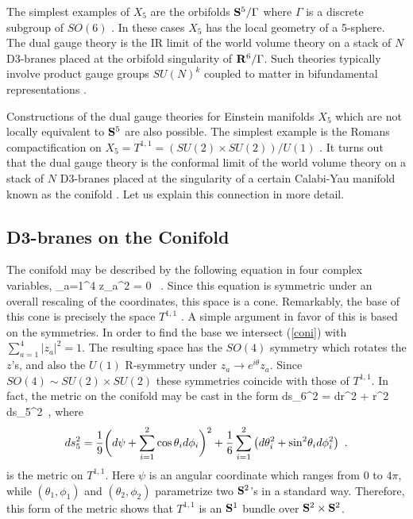 The simplest examples of $X_5$ are the orbifolds ${\bf S}^5/\Gamma$ where 
$\Gamma$ is a discrete subgroup of $SO(6)$ \cite{ks,lnv}. In these cases
$X_5$ has the local geometry of a 5-sphere.
The dual gauge theory is the IR
limit of the world volume theory on a stack of $N$ D3-branes placed at
the orbifold singularity of ${\bf R}^6/\Gamma$. Such theories
typically involve product gauge groups $SU(N)^k$ coupled to matter
in bifundamental representations \cite{dm}.

Constructions of the dual gauge theories for Einstein manifolds
$X_5$ which are not locally equivalent to ${\bf S}^5$ are also possible. 
The simplest
example is the Romans compactification on
$X_5= T^{1,1}= (SU(2)\times SU(2))/U(1)$ \cite{Romans,KW}. 
It turns out that
the dual gauge theory is the conformal limit of 
the world volume theory on a stack of $N$ D3-branes placed at
the singularity of a certain Calabi-Yau
manifold known as the conifold \cite{KW}. Let us explain this connection
in more detail. 

\subsection{D3-branes on the Conifold}

The conifold may be described by the
following equation in four complex variables,
\be \label{coni}
\sum_{a=1}^4 z_a^2 = 0
\ .
\ee
Since this equation is symmetric under an overall rescaling of the
coordinates, this space is a cone. Remarkably, the base of this cone
is precisely the space $T^{1,1}$ \cite{cd,KW}. A simple argument
in favor of this is based on the symmetries. In order to find the base
we intersect (\ref{coni}) with $\sum_{a=1}^4 |z_a|^2 = 1$.
The resulting space has the $SO(4)$ symmetry which rotates the $z$'s,
and also the $U(1)$ R-symmetry under $z_a\rightarrow e^{i\theta} z_a$.
Since $SO(4)\sim SU(2)\times SU(2)$ these symmetries coincide with those
of $T^{1,1}$. In fact, the metric on the conifold may be
cast in the form \cite{cd}
\be
ds_6^2 = dr^2 + r^2 ds_5^2\ ,
\ee
where 
\begin{equation} \label{co}
d s_5^2=
{1\over 9} \bigg(d\psi + 
\sum_{i=1}^2 \cos \theta_i d\phi_i\bigg)^2+
{1\over 6} \sum_{i=1}^2 \left(
d\theta_i^2 + {\rm sin}^2\theta_i d\phi_i^2
 \right)
\ .
\end{equation}
is the metric on $T^{1,1}$. Here $\psi$ is an angular coordinate
which  ranges from $0$ to $4\pi$,  while $(\theta_1,\phi_1)$
and $(\theta_2,\phi_2)$ parametrize two ${\bf S}^2$'s in a standard way.
Therefore, this form of the metric shows that
$T^{1,1}$ is an ${\bf S}^1$ bundle over ${\bf S}^2 \times {\bf S}^2$.

